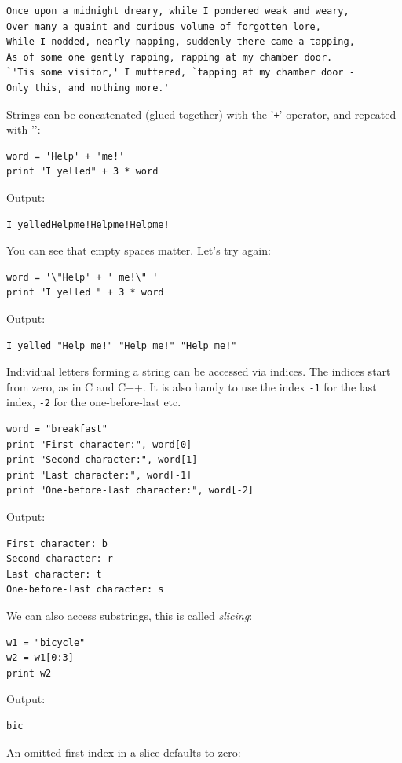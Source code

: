 \documentclass[article,A4,12pt]{llncs}
\begin{document}
\begin{verbatim}
Once upon a midnight dreary, while I pondered weak and weary,
Over many a quaint and curious volume of forgotten lore,
While I nodded, nearly napping, suddenly there came a tapping,
As of some one gently rapping, rapping at my chamber door.
`'Tis some visitor,' I muttered, `tapping at my chamber door -
Only this, and nothing more.'
\end{verbatim}
Strings can be concatenated (glued together) with the '{\tt +}' operator, and repeated with '{\tt *}':

\begin{verbatim}
word = 'Help' + 'me!'
print "I yelled" + 3 * word
\end{verbatim}
Output:

\begin{verbatim}
I yelledHelpme!Helpme!Helpme!
\end{verbatim}
You can see that empty spaces matter. Let's try again:

\begin{verbatim}
word = '\"Help' + ' me!\" '
print "I yelled " + 3 * word
\end{verbatim}
Output:

\begin{verbatim}
I yelled "Help me!" "Help me!" "Help me!"
\end{verbatim}
Individual letters forming a string can be accessed via indices. The indices 
start from zero, as in C and C++. It is also handy to use the index {\tt -1} 
for the last index, {\tt -2} for the one-before-last etc.


\begin{verbatim}
word = "breakfast"
print "First character:", word[0]
print "Second character:", word[1]
print "Last character:", word[-1]
print "One-before-last character:", word[-2]
\end{verbatim}
Output:

\begin{verbatim}
First character: b
Second character: r
Last character: t
One-before-last character: s
\end{verbatim}
We can also access substrings, this is called {\em slicing}:

\begin{verbatim}
w1 = "bicycle"
w2 = w1[0:3]
print w2
\end{verbatim}
Output:

\begin{verbatim}
bic
\end{verbatim}
An omitted first index in a slice defaults to zero:
\end{document}
